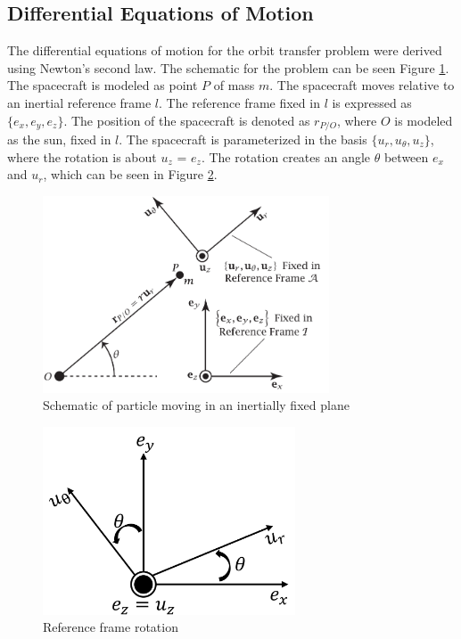 \documentclass[]{article}
\begin{document}
	\subsection{Differential Equations of Motion}
	The differential equations of motion for the orbit transfer problem were derived using Newton's second law. The schematic for the problem can be seen Figure \ref{fig:schematic}. The spacecraft is modeled as point \(P\) of  mass \(m\). The spacecraft moves relative to an inertial reference frame \(l\). The reference frame fixed in \(l\) is expressed as \(\{e_{x},e_{y},e_{z}\}\). The position of the spacecraft is denoted as \(r_{P/O}\), where \(O\) is modeled as the sun, fixed in \(l\). The spacecraft is parameterized in the basis \(\{u_{r},u_{\theta},u_{z}\}\), where the rotation is about \(u_{z}\) = \(e_{z}\). The rotation creates an angle \(\theta\) between \(e_{x}\) and \(u_{r}\), which can be seen in Figure \ref{fig:rotation2}.
	\begin{figure}
		\centering
		\includegraphics[width=85mm,scale=0.85]{midterm_schematic.png}
		\caption{Schematic of particle moving in an inertially fixed plane}
		\label{fig:schematic}
	\end{figure}
	\begin{figure}
		\centering
		\includegraphics[width=75mm,scale=0.75]{rotation.png}
		\caption{Reference frame rotation}
		\label{fig:rotation2}
	\end{figure}
\end{document}
